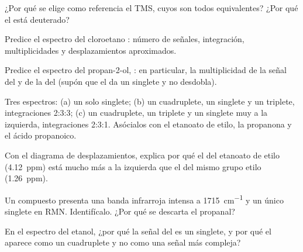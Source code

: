 \begin{exercise}[$\star$]\label{exo:g12:proton-nmr:5}
¿Por qué se elige como referencia el TMS, cuyos  son todos
equivalentes? ¿Por qué el  está deuterado?
\end{exercise}

\begin{exercise}[$\star\star$]\label{exo:g12:proton-nmr:6}
Predice el espectro del cloroetano : número de señales,
integración, multiplicidades y desplazamientos aproximados.
\end{exercise}

\begin{exercise}[$\star\star$]\label{exo:g12:proton-nmr:7}
Predice el espectro del propan-2-ol, : en particular, la
multiplicidad de la señal del  y de la del  (supón que el
 da un singlete y no desdobla).
\end{exercise}

\begin{exercise}[$\star\star$]\label{exo:g12:proton-nmr:8}
Tres espectros: (a) un solo singlete; (b) un cuadruplete, un singlete y
un triplete, integraciones 2:3:3; (c) un cuadruplete, un triplete y un
singlete muy a la izquierda, integraciones 2:3:1. Asócialos con el
etanoato de etilo, la propanona y el ácido propanoico.
\end{exercise}

\begin{exercise}[$\star\star$]\label{exo:g12:proton-nmr:9}
Con el diagrama de desplazamientos, explica por qué el  del
etanoato de etilo (\qty{4.12}{ppm}) está mucho más a la izquierda que el
 del mismo grupo etilo (\qty{1.26}{ppm}).
\end{exercise}

\begin{exercise}[$\star\star$]\label{exo:g12:proton-nmr:10}
Un compuesto  presenta una banda infrarroja intensa a
\qty{1715}{cm^{-1}} y un único singlete en RMN. Identifícalo. ¿Por qué
se descarta el propanal?
\end{exercise}

\begin{exercise}[$\star\star$]\label{exo:g12:proton-nmr:11}
En el espectro del etanol, ¿por qué la señal del  es un singlete,
y por qué el  aparece como un cuadruplete y no como una señal más
compleja?
\end{exercise}

